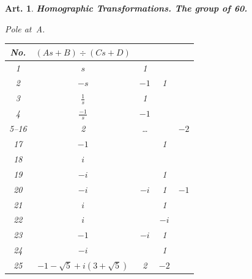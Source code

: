 \documentclass[11pt,a4paper]{article}
\theoremstyle{plain}
\newtheorem{art}{Art.}[section]
\begin{document}
\begin{art}
\textbf{Homographic Transformations. The group of 60.}

Pole at~A.

\begin{center}
\begin{longtable}{|c|c|c|c|c|}
\hline
No. & $(As+B) \div (Cs+D)$ & & & \\
\hline
1 & $s$ & 1 & & \\
2 & $-s$ & $-1$ & 1 & \\
3 & $\frac{1}{s}$ & 1 & & \\
4 & $\frac{-1}{s}$ & $-1$ & & \\
5--16 & 2 & \ldots & & $-2$ \\
17 & $-1$ & & 1 & \\
18 & $i$ & & & \\
19 & $-i$ & & 1 & \\
20 & $-i$ & $-i$ & 1 & $-1$ \\
21 & $i$ & & 1 & \\
22 & $i$ & & $-i$ & \\
23 & $-1$ & $-i$ & 1 & \\
24 & $-i$ & & 1 & \\
25 & $-1-\sqrt{5}+i(3+\sqrt{5})$ & 2 & $-2$ & \\
\hline
\end{longtable}
\end{center}
\end{art}
\end{document}
